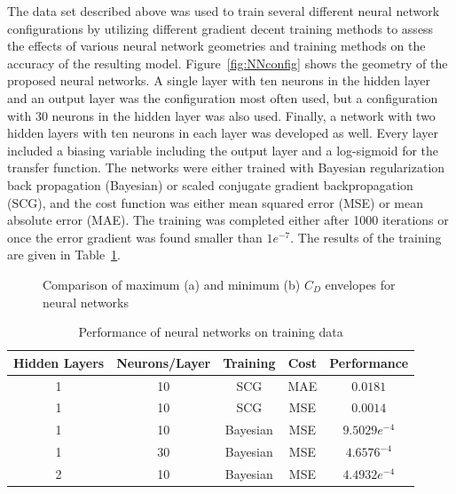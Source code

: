 \documentclass[11pt]{ucthesis}
\begin{document}
The data set described above was used to train several different neural network configurations by utilizing different gradient decent training methods to assess the effects of various neural network geometries and training methods on the accuracy of the resulting model. Figure~\ref{fig:NNconfig} shows the geometry of the proposed neural networks. A single layer with ten neurons in the hidden layer and an output layer was the configuration most often used, but a configuration with 30 neurons in the hidden layer was also used. Finally, a network with two hidden layers with ten neurons in each layer was developed as well. Every layer included a biasing variable including the output layer and a log-sigmoid for the transfer function. The networks were either trained with Bayesian regularization back propagation (Bayesian) or scaled conjugate gradient backpropagation (SCG), and the cost function was either mean squared error (MSE) or mean absolute error (MAE). The training was completed either after 1000 iterations or once the error gradient was found smaller than $1e^{-7}$. The results of the training are given in Table~\ref{tab:error}.
\begin{figure}[thpb]
\centering
{} 
\caption{Comparison of maximum (a) and minimum (b) $C_D$ envelopes for neural networks}
\label{fig:NNCDMax}
\end{figure}
\begin{table}[h]
\caption{Performance of neural networks on training data}
\label{tab:error}
\begin{center}
\begin{tabular}{|c||c||c||c||c|}
\hline
Hidden Layers&Neurons/Layer&Training&Cost&Performance\\
\hline
1 & 10&SCG&MAE&$0.0181$\\
\hline
1 & 10&SCG&MSE&$0.0014$\\
\hline
1 & 10&Bayesian&MSE&$9.5029e^{-4}$\\
\hline
1 & 30&Bayesian&MSE&$4.6576^{-4}$\\
\hline
2& 10&Bayesian&MSE&$4.4932e^{-4}$\\
\hline
\end{tabular}
\end{center}
\end{table}
\end{document}
